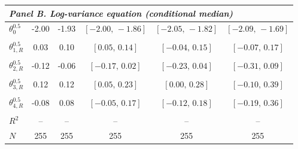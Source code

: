 \begin{table}[!htbp]
\begin{threeparttable}
\begin{tabular}{lccccc}
\midrule
\multicolumn{6}{l}{\textit{Panel B. Log-variance equation (conditional median)}} \\
\midrule
$\theta^{0.5}_0$ & -2.00 & -1.93 & $[-2.00,\,-1.86]$ & $[-2.05,\,-1.82]$ & $[-2.09,\,-1.69]$ \\
 &  &  &  &  &  \\
\midrule
$\theta^{0.5}_{1,R}$ & 0.03 & 0.10 & $[0.05,\,0.14]$ & $[-0.04,\,0.15]$ & $[-0.07,\,0.17]$ \\
 &  &  &  &  &  \\
$\theta^{0.5}_{2,R}$ & -0.12 & -0.06 & $[-0.17,\,0.02]$ & $[-0.23,\,0.04]$ & $[-0.31,\,0.09]$ \\
 &  &  &  &  &  \\
$\theta^{0.5}_{3,R}$ & 0.12 & 0.12 & $[0.05,\,0.23]$ & $[0.00,\,0.28]$ & $[-0.10,\,0.39]$ \\
 &  &  &  &  &  \\
$\theta^{0.5}_{4,R}$ & -0.08 & 0.08 & $[-0.05,\,0.17]$ & $[-0.12,\,0.18]$ & $[-0.19,\,0.36]$ \\
 &  &  &  &  &  \\
\midrule
$R^2$ & -- & -- & -- & -- & -- \\
$N$ & 255 & 255 & 255 & 255 & 255 \\
\bottomrule
\end{tabular}
\begin{tablenotes}[flushleft]
\scriptsize

\end{tablenotes}
\end{threeparttable}
\end{table}
